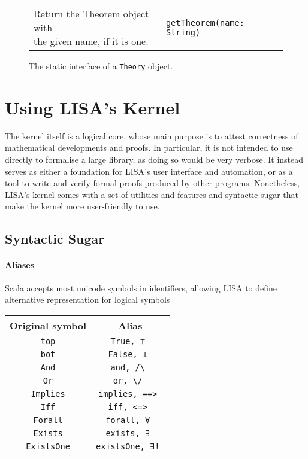 {\begin{figure}[hp]
\begin{center}
\begin{tabular}{l|l}
          \makecell[l]{Return the Theorem object with   \\the given name, if it is one.} &
          \begin{lstlisting}
getTheorem(name: String)
\end{lstlisting}
          \\ %
        \end{tabular}
        \caption{The static interface of a \lstinline{Theory}{} object.}
        \label{fig:theorygetters}
      \end{center}
    \end{figure}

\fi
  }

\section{Using LISA's Kernel}
\label{sect:kernelHelpers}
The kernel itself is a logical core, whose main purpose is to attest correctness of mathematical developments and proofs. In particular, it is not intended to use directly to formalise a large library, as doing so would be very verbose. It instead serves as either a foundation for LISA's user interface and automation, or as a tool to write and verify formal proofs produced by other programs.
Nonetheless, LISA's kernel comes with a set of utilities and features and syntactic sugar that make the kernel more user-friendly to use.
\subsection{Syntactic Sugar}

\paragraph{Aliases}
Scala accepts most unicode symbols in identifiers, allowing LISA to define alternative representation for logical symbols
\begin{center}
\begin{tabular}{| c | c |}

  \hline
  Original symbol & Alias \\
  \hline
  
  \lstinline|top| & \lstinline|True, ⊤ |  \\ \hline
  \lstinline|bot| & \lstinline|False, ⊥ |  \\ \hline
  \lstinline|And| & \lstinline|and, /\ |  \\ \hline
  \lstinline|Or| & \lstinline|or, \/ |  \\ \hline
  \lstinline|Implies| & \lstinline|implies, ==> |  \\ \hline
  \lstinline|Iff| & \lstinline|iff, <=> |  \\ \hline
  \lstinline|Forall| & \lstinline|forall, ∀ |  \\ \hline
  \lstinline|Exists| & \lstinline|exists, ∃ |  \\ \hline
  \lstinline|ExistsOne| & \lstinline|existsOne, ∃! |  \\ \hline
  
\end{tabular}
\end{center}
